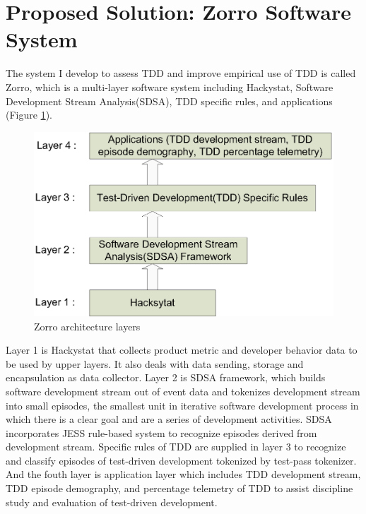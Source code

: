 \section{Proposed Solution: Zorro Software System}
The system I develop to assess TDD and improve empirical use of TDD is
called Zorro, which is a multi-layer software system including Hackystat,
Software Development Stream Analysis(SDSA), TDD specific rules, and
applications (Figure \ref{fig:ZorroLayer}).
\begin{figure}[htbp] 
  \centering
  \includegraphics{figs/zorro-layer.eps}
  \caption{Zorro architecture layers}\label{fig:ZorroLayer}
\end{figure} 
Layer 1 is Hackystat that collects product metric and developer behavior
data to be used by upper layers. It also deals with data sending, storage
and encapsulation as data collector. Layer 2 is SDSA framework, which
builds software development stream out of event data and tokenizes
development stream into small episodes, the smallest unit in iterative
software development process in which there is a clear goal and are a
series of development activities. SDSA incorporates
JESS\cite{Friedman-Hill:03} rule-based system to recognize episodes derived
from development stream. Specific rules of TDD are supplied in layer 3 to
recognize and classify episodes of test-driven development tokenized by
test-pass tokenizer. And the fouth layer is application layer which
includes TDD development stream, TDD episode demography, and percentage
telemetry of TDD to assist discipline study and evaluation of test-driven
development.

